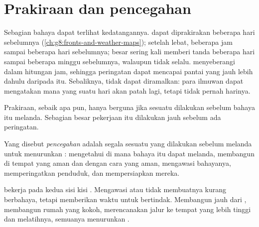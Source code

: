 \section{Prakiraan dan pencegahan}

Sebagian bahaya dapat terlihat kedatangannya.  dapat diprakirakan
beberapa hari sebelumnya (\cref{ch:g8:fronts-and-weather-maps}); 
setelah  lebat, beberapa jam sampai beberapa hari sebelumnya; 
besar sering kali memberi tanda beberapa hari sampai beberapa minggu
sebelumnya, walaupun tidak selalu.  menyeberangi  dalam
hitungan jam, sehingga peringatan dapat mencapai pantai yang jauh lebih
dahulu daripada  itu. Sebaliknya,  tidak dapat
diramalkan: para ilmuwan dapat mengatakan  mana yang suatu hari akan
patah lagi, tetapi tidak pernah harinya.

Prakiraan, sebaik apa pun, hanya berguna jika sesuatu dilakukan sebelum
bahaya itu melanda. Sebagian besar pekerjaan itu dilakukan jauh sebelum
ada peringatan.

\begin{definition}[Pencegahan]\label{def:g9:natural-risks:prevention}
Yang disebut \emph{pencegahan} adalah segala sesuatu yang
dilakukan sebelum  melanda untuk menurunkan : mengetahui
di mana bahaya itu dapat melanda, membangun di tempat yang aman dan dengan
cara yang aman, mengawasi bahayanya, memperingatkan penduduk, dan
mempersiapkan mereka.
\end{definition}

 bekerja pada kedua sisi kisi . Mengawasi  atau
 tidak membuatnya kurang berbahaya, tetapi memberikan waktu untuk
bertindak. Membangun jauh dari , membangun rumah yang kokoh,
merencanakan jalur ke tempat yang lebih tinggi dan melatihnya, semuanya
menurunkan .

